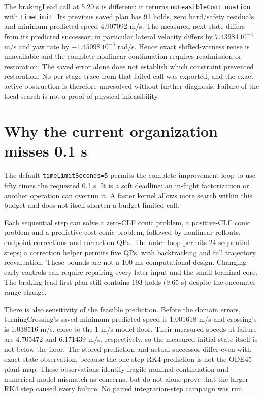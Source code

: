 \documentclass[11pt]{article}
\begin{document}
The brakingLead call at 5.20 s is different: it returns
\texttt{noFeasibleContinuation} with \texttt{timeLimit}. Its previous saved
plan has 91 holds, zero hard/safety residuals and minimum predicted speed
4.907092 m/s. The measured next state differs from its predicted successor;
in particular lateral velocity differs by $7.43984\,10^{-4}$ m/s and yaw
rate by $-1.45098\,10^{-3}$ rad/s. Hence exact shifted-witness reuse is
unavailable and the complete nonlinear continuation requires readmission or
restoration. The saved error alone does not establish which constraint
prevented restoration. No per-stage trace from that failed call was exported,
and the exact active obstruction is therefore unresolved without further
diagnosis. Failure of the local search is not a proof of physical infeasibility.

\section{Why the current organization misses 0.1 s}
The default \texttt{timeLimitSeconds=5} permits the complete improvement loop
to use fifty times the requested 0.1 s. It is a soft deadline: an in-flight
factorization or another operation can overrun it. A faster kernel allows
more search within this budget and does not itself shorten a budget-limited
call.

Each sequential step can solve a zero-CLF conic problem, a positive-CLF
conic problem and a predictive-cost conic problem, followed by nonlinear
rollouts, endpoint corrections and correction QPs. The outer loop permits
24 sequential steps; a correction helper permits five QPs, with backtracking
and full trajectory reevaluation. These bounds are not a 100-ms computational
design. Changing early controls can require repairing every later input and
the small terminal core. The braking-lead first plan still contains 193 holds
(9.65 s) despite the encounter-range change.

There is also sensitivity of the feasible prediction. Before the domain
errors, turningCrossing's saved minimum predicted speed is 1.001618 m/s and
crossing's is 1.038516 m/s, close to the 1-m/s model floor. Their measured
speeds at failure are 4.705472 and 6.171439 m/s, respectively, so the measured
initial state itself is not below the floor. The stored prediction and actual
successor differ even with exact state observation, because the one-step RK4
prediction is not the ODE45 plant map. These observations identify fragile
nominal continuation and numerical-model mismatch as concerns, but do not
alone prove that the larger RK4 step caused every failure. No paired
integration-step campaign was run.
\end{document}
